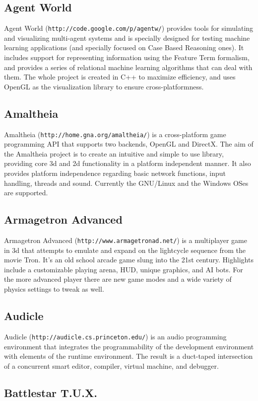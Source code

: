 \subsection{Agent World}\label{ftgl-projects_agentw}
Agent World ({\tt http://code.google.com/p/agentw/}) provides tools for simulating and visualizing multi-agent systems and is specially designed for testing machine learning applications (and specially focused on Case Based Reasoning ones). It includes support for representing information using the Feature Term formalism, and provides a series of relational machine learning algorithms that can deal with them. The whole project is created in C++ to maximize efficiency, and uses OpenGL as the visualization library to ensure cross-platformness.\subsection{Amaltheia}\label{ftgl-projects_amaltheia}
Amaltheia ({\tt http://home.gna.org/amaltheia/}) is a cross-platform game programming API that supports two backends, OpenGL and DirectX. The aim of the Amaltheia project is to create an intuitive and simple to use library, providing core 3d and 2d functionality in a platform independent manner. It also provides platform independence regarding basic network functions, input handling, threads and sound. Currently the GNU/Linux and the Windows OSes are supported.\subsection{Armagetron Advanced}\label{ftgl-projects_armagetronad}
Armagetron Advanced ({\tt http://www.armagetronad.net/}) is a multiplayer game in 3d that attempts to emulate and expand on the lightcycle sequence from the movie Tron. It's an old school arcade game slung into the 21st century. Highlights include a customizable playing arena, HUD, unique graphics, and AI bots. For the more advanced player there are new game modes and a wide variety of physics settings to tweak as well.\subsection{Audicle}\label{ftgl-projects_audicle}
Audicle ({\tt http://audicle.cs.princeton.edu/}) is an audio programming environment that integrates the programmability of the development environment with elements of the runtime environment. The result is a duct-taped intersection of a concurrent smart editor, compiler, virtual machine, and debugger.\subsection{Battlestar T.U.X.}\label{ftgl-projects_battlestartux}
